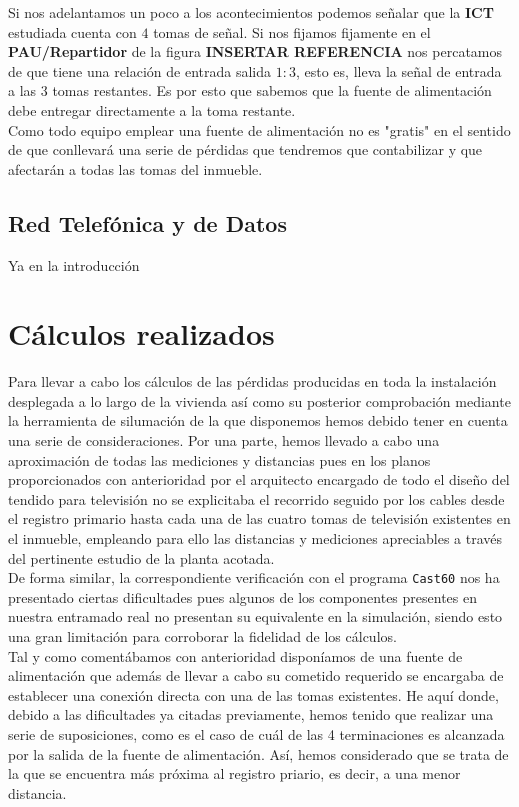 \documentclass{article}[12 pt]
\begin{document}
			Si nos adelantamos un poco a los acontecimientos podemos señalar que la \textbf{ICT} estudiada cuenta con $4$ tomas de señal. Si nos fijamos fijamente en el \textbf{PAU/Repartidor} de la figura \textbf{INSERTAR REFERENCIA} nos percatamos de que tiene una relación de entrada salida $1:3$, esto es, lleva la señal de entrada a las $3$ tomas restantes. Es por esto que sabemos que la fuente de alimentación debe entregar directamente a la toma restante.\\

			Como todo equipo emplear una fuente de alimentación no es "gratis" en el sentido de que conllevará una serie de pérdidas que tendremos que contabilizar y que afectarán a todas las tomas del inmueble.\\

		\subsection{Red Telefónica y de Datos}
			Ya en la introducción

	\section{Cálculos realizados}
		Para llevar a cabo los cálculos de las pérdidas producidas en toda la instalación desplegada a lo largo de la vivienda así como su posterior comprobación mediante la herramienta de silumación de la que disponemos hemos debido tener en cuenta una serie de consideraciones. Por una parte, hemos llevado a cabo una aproximación de todas las mediciones y distancias pues en los planos proporcionados con anterioridad por el arquitecto encargado de todo el diseño del tendido para televisión no se explicitaba el recorrido seguido por los cables desde el registro primario hasta cada una de las cuatro tomas de televisión existentes en el inmueble, empleando para ello las distancias y mediciones apreciables a través del pertinente estudio de la planta acotada.\\

		De forma similar, la correspondiente verificación con el programa \texttt{Cast60} nos ha presentado ciertas dificultades pues algunos de los componentes presentes en nuestra entramado real no presentan su equivalente en la simulación, siendo esto una gran limitación para corroborar la fidelidad de los cálculos.\\

		Tal y como comentábamos con anterioridad disponíamos de una fuente de alimentación que además de llevar a cabo su cometido requerido se encargaba de establecer una conexión directa con una de las tomas existentes. He aquí donde, debido a las dificultades ya citadas previamente, hemos tenido que realizar una serie de suposiciones, como es el caso de cuál de las 4 terminaciones es alcanzada por la salida de la fuente de alimentación. Así, hemos considerado que se trata de la que se encuentra más próxima al registro priario, es decir, a una menor distancia.\\
\end{document}

